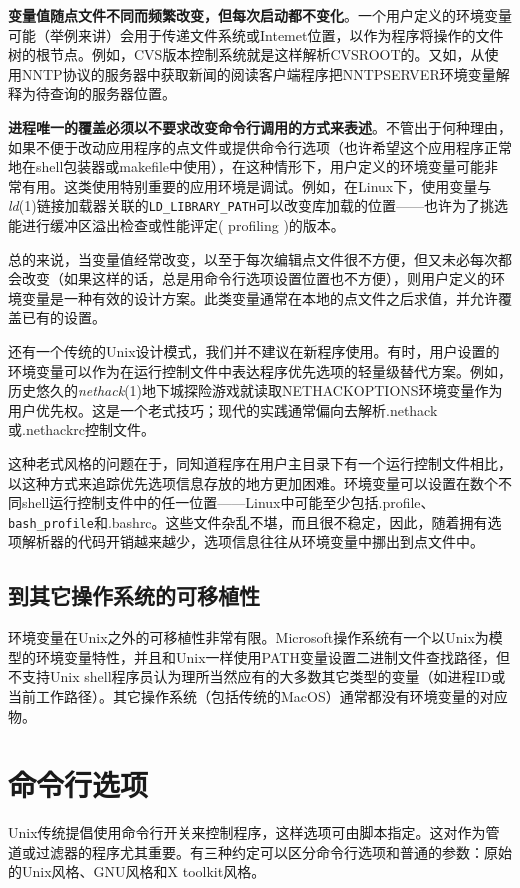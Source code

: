 \documentclass[12pt,oneside]{book}
\begin{document}
\begin{common-format}
\textbf{变量值随点文件不同而频繁改变，但每次启动都不变化}。一个用户定义的环境变量可能（举例来讲）会用于传递文件系统或Intemet位置，以作为程序将操作的文件树的根节点。例如，CVS版本控制系统就是这样解析CVSROOT的。又如，从使用NNTP协议的服务器中获取新闻的阅读客户端程序把NNTPSERVER环境变量解释为待查询的服务器位置。

\textbf{进程唯一的覆盖必须以不要求改变命令行调用的方式来表述}。不管出于何种理由，如果不便于改动应用程序的点文件或提供命令行选项（也许希望这个应用程序正常地在shell包装器或makefile中使用），在这种情形下，用户定义的环境变量可能非常有用。这类使用特别重要的应用环境是调试。例如，在Linux下，使用变量与\textit{ld}(1)链接加载器关联的\verb+LD_LIBRARY_PATH+可以改变库加载的位置——也许为了挑选能进行缓冲区溢出检查或性能评定( profiling )的版本。

总的来说，当变量值经常改变，以至于每次编辑点文件很不方便，但又未必每次都会改变（如果这样的话，总是用命令行选项设置位置也不方便），则用户定义的环境变量是一种有效的设计方案。此类变量通常在本地的点文件之后求值，并允许覆盖已有的设置。

还有一个传统的Unix设计模式，我们并不建议在新程序使用。有时，用户设置的环境变量可以作为在运行控制文件中表达程序优先选项的轻量级替代方案。例如，历史悠久的\textit{nethack}(1)地下城探险游戏就读取NETHACKOPTIONS环境变量作为用户优先权。这是一个老式技巧；现代的实践通常偏向去解析.nethack或.nethackrc控制文件。

这种老式风格的问题在于，同知道程序在用户主目录下有一个运行控制文件相比，以这种方式来追踪优先选项信息存放的地方更加困难。环境变量可以设置在数个不同shell运行控制支件中的任一位置——Linux中可能至少包括.profile、\verb+bash_profile+和.bashrc。这些文件杂乱不堪，而且很不稳定，因此，随着拥有选项解析器的代码开销越来越少，选项信息往往从环境变量中挪出到点文件中。

\subsection{到其它操作系统的可移植性}
环境变量在Unix之外的可移植性非常有限。Microsoft操作系统有一个以Unix为模型的环境变量特性，并且和Unix一样使用PATH变量设置二进制文件查找路径，但不支持Unix shell程序员认为理所当然应有的大多数其它类型的变量（如进程ID或当前工作路径）。其它操作系统（包括传统的MacOS）通常都没有环境变量的对应物。

\section{命令行选项}
Unix传统提倡使用命令行开关来控制程序，这样选项可由脚本指定。这对作为管道或过滤器的程序尤其重要。有三种约定可以区分命令行选项和普通的参数：原始的Unix风格、GNU风格和X toolkit风格。


\end{common-format}
\end{document}
